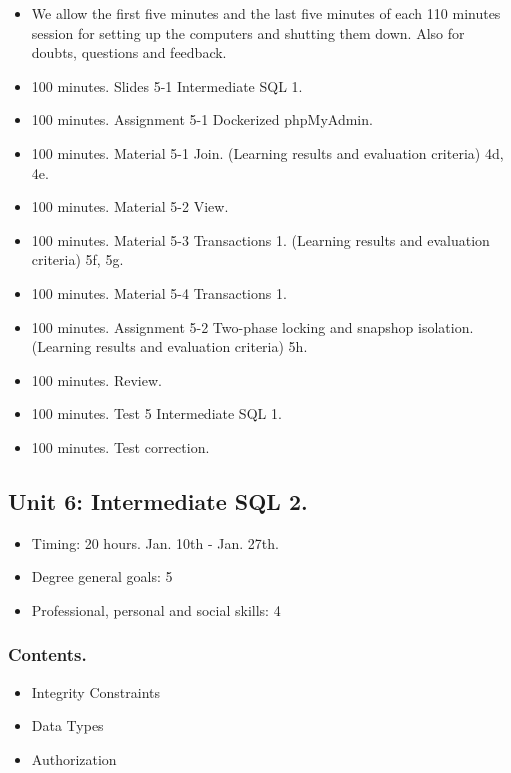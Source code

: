 \documentclass[catalan, a4paper, 12pt, titlepage]{article}
\begin{document}
  \begin{itemize}
          \item We allow the first five minutes and the last five minutes of each 110 minutes session for setting up the computers and shutting them down. Also for doubts, questions and feedback.
	  \item 100 minutes. Slides 5-1 Intermediate SQL 1.
	  \item 100 minutes. Assignment 5-1 Dockerized phpMyAdmin.
	  \item 100 minutes. Material 5-1 Join. (\faGraduationCap Learning results and evaluation criteria) 4d, 4e.
	  \item 100 minutes. Material 5-2 View.
	  \item 100 minutes. Material 5-3 Transactions 1. (\faGraduationCap Learning results and evaluation criteria) 5f, 5g.
	  \item 100 minutes. Material 5-4 Transactions 1.
	  \item 100 minutes. Assignment 5-2 Two-phase locking and snapshop isolation. (\faGraduationCap Learning results and evaluation criteria) 5h.
	  \item 100 minutes. Review.
	  \item 100 minutes. Test 5 Intermediate SQL 1.
	  \item 100 minutes. Test correction.
  \end{itemize}

  \subsection{Unit 6: Intermediate SQL 2.}

  \begin{itemize}
	\item Timing: 20 hours. Jan. 10th - Jan. 27th.
	\item Degree general goals: 5
	\item Professional, personal and social skills: 4
  \end{itemize}
  
  \subsubsection{Contents.}
  \begin{itemize}
	  \item Integrity Constraints
	  \item Data Types
	  \item Authorization
  \end{itemize}
\end{document}
